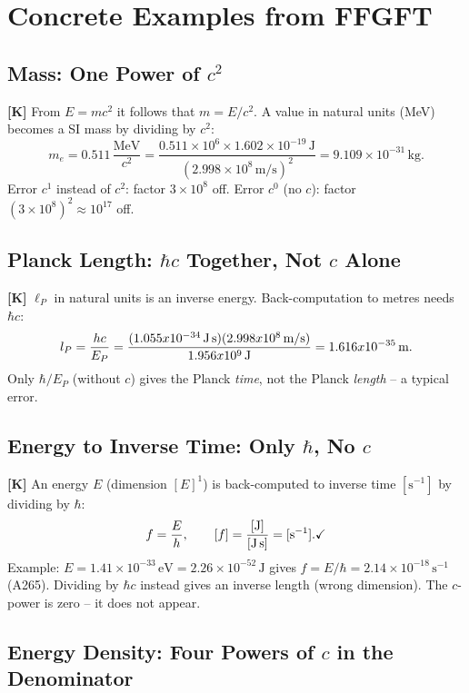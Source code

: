 \section{Concrete Examples from FFGFT}

\subsection{Mass: One Power of $c^2$}

\textbf{[K]} From $E=mc^2$ it follows that $m=E/c^2$. A value in natural units
(MeV) becomes a SI mass by dividing by $c^2$:
\[
  m_e = 0{.}511\,\frac{\text{MeV}}{c^2}
  = \frac{0{.}511\times10^6\times1{.}602\times10^{-19}\,\text{J}}{(2{.}998\times10^8\,\text{m/s})^2}
  = 9{.}109\times10^{-31}\,\text{kg}.
\]
Error $c^1$ instead of $c^2$: factor $3\times10^8$ off.
Error $c^0$ (no $c$): factor $(3\times10^8)^2\approx10^{17}$ off.

\subsection{Planck Length: $\hbar c$ Together, Not $c$ Alone}

\textbf{[K]} $\ell_P$ in natural units is an inverse energy. Back-computation to
metres needs $\hbar c$:
\[
  \ell_P = \frac{\hbar c}{E_P}
  = \frac{(1{.}055\times10^{-34}\,\text{J\,s})(2{.}998\times10^8\,\text{m/s})}
         {1{.}956\times10^9\,\text{J}}
  = 1{.}616\times10^{-35}\,\text{m}.
\]
Only $\hbar/E_P$ (without $c$) gives the Planck \emph{time}, not the Planck
\emph{length} -- a typical error.

\subsection{Energy to Inverse Time: Only $\hbar$, No $c$}

\textbf{[K]} An energy $E$ (dimension $[E]^1$) is back-computed to inverse time
$[\text{s}^{-1}]$ by dividing by $\hbar$:
\[
  f = \frac{E}{\hbar},
  \qquad
  [f] = \frac{[\text{J}]}{[\text{J\,s}]} = [\text{s}^{-1}].\checkmark
\]
Example: $E=1{.}41\times10^{-33}\,\text{eV}=2{.}26\times10^{-52}\,\text{J}$ gives
$f=E/\hbar=2{.}14\times10^{-18}\,\text{s}^{-1}$ (A265). Dividing by $\hbar c$
instead gives an inverse length (wrong dimension). The $c$-power is zero -- it
does not appear.

\subsection{Energy Density: Four Powers of $c$ in the Denominator}

